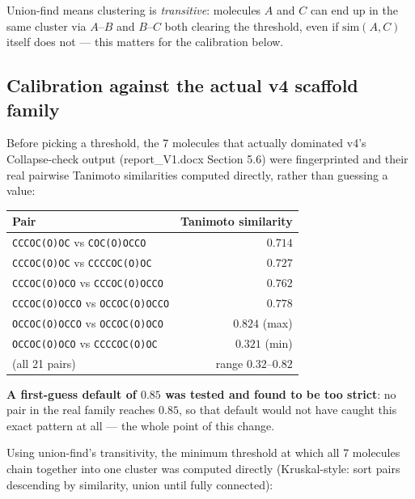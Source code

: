 \documentclass[11pt]{article}
\newcommand{\code}[1]{\texttt{#1}}
\begin{document}
Union-find means clustering is \emph{transitive}: molecules $A$ and $C$ can end up in the same cluster via $A$--$B$ and $B$--$C$ both clearing the threshold, even if $\text{sim}(A,C)$ itself does not --- this matters for the calibration below.

\subsection{Calibration against the actual v4 scaffold family}

Before picking a threshold, the 7 molecules that actually dominated v4's Collapse-check output (report\_V1.docx Section 5.6) were fingerprinted and their real pairwise Tanimoto similarities computed directly, rather than guessing a value:

\begin{center}
\begin{tabular}{@{}l r@{}}
\toprule
\textbf{Pair} & \textbf{Tanimoto similarity} \\
\midrule
\code{CCCOC(O)OC} vs \code{COC(O)OCCO} & $0.714$ \\
\code{CCCOC(O)OC} vs \code{CCCCOC(O)OC} & $0.727$ \\
\code{CCCOC(O)OCO} vs \code{CCCOC(O)OCCO} & $0.762$ \\
\code{CCCOC(O)OCCO} vs \code{OCCOC(O)OCCO} & $0.778$ \\
\code{OCCOC(O)OCCO} vs \code{OCCOC(O)OCO} & $0.824$ (max) \\
\code{OCCOC(O)OCO} vs \code{CCCCOC(O)OC} & $0.321$ (min) \\
(all 21 pairs) & range $0.32$--$0.82$ \\
\bottomrule
\end{tabular}
\end{center}

\textbf{A first-guess default of $0.85$ was tested and found to be too strict}: no pair in the real family reaches $0.85$, so that default would not have caught this exact pattern at all --- the whole point of this change.

Using union-find's transitivity, the minimum threshold at which all 7 molecules chain together into one cluster was computed directly (Kruskal-style: sort pairs descending by similarity, union until fully connected):
\end{document}
